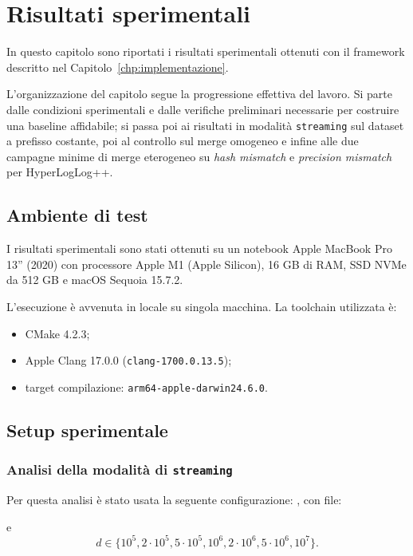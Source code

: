 \chapter{Risultati sperimentali}
\label{chp:risultati}

In questo capitolo sono riportati i risultati sperimentali ottenuti con il
framework descritto nel Capitolo~\ref{chp:implementazione}.

L'organizzazione del capitolo segue la progressione effettiva del lavoro.
Si parte dalle condizioni sperimentali e dalle verifiche preliminari necessarie
per costruire una baseline affidabile; si passa poi ai risultati in modalità
\texttt{streaming} sul dataset a prefisso costante, poi al controllo sul
merge omogeneo e infine alle due campagne minime di merge eterogeneo su
\emph{hash mismatch} e \emph{precision mismatch} per HyperLogLog++.

\section{Ambiente di test}

I risultati sperimentali sono stati ottenuti su un notebook Apple MacBook Pro
13'' (2020) con processore Apple M1 (Apple Silicon), 16 GB di RAM, SSD NVMe da
512 GB e macOS Sequoia 15.7.2.

L'esecuzione è avvenuta in locale su singola macchina. La toolchain utilizzata
è:
\begin{itemize}
    \item CMake 4.2.3;
    \item Apple Clang 17.0.0 (\texttt{clang-1700.0.13.5});
    \item target compilazione: \texttt{arm64-apple-darwin24.6.0}.
\end{itemize}

\section{Setup sperimentale}

\subsection{Analisi della modalit\`a di \texttt{streaming}}

Per questa analisi è stato usata la seguente configurazione:
, con file:
\begin{center}
\small
{}
\end{center}
e
\[
d \in \{10^5,2\cdot 10^5,5\cdot 10^5,10^6,2\cdot 10^6,5\cdot 10^6,10^7\}.
\]

